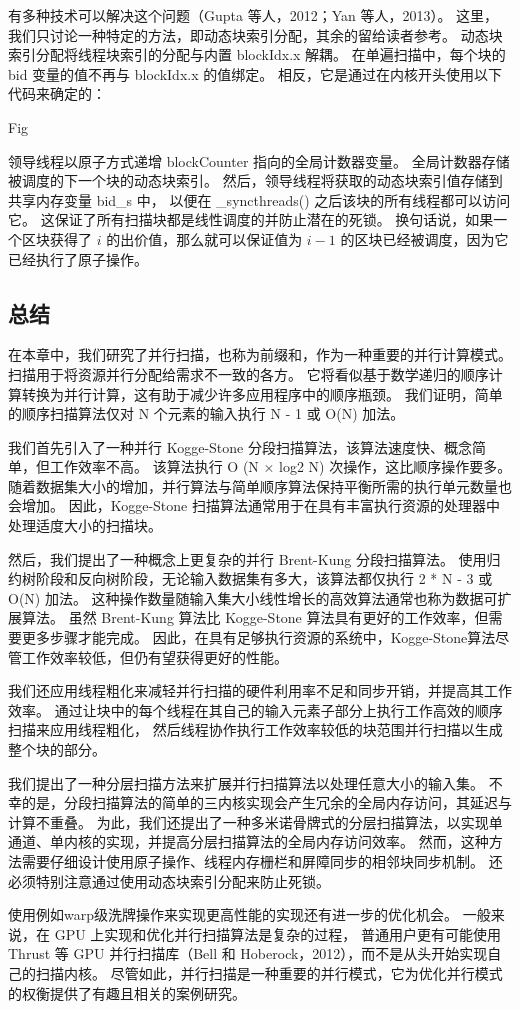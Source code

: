 有多种技术可以解决这个问题（Gupta 等人，2012；Yan 等人，2013）。 
这里，我们只讨论一种特定的方法，即动态块索引分配，其余的留给读者参考。 
动态块索引分配将线程块索引的分配与内置 blockIdx.x 解耦。 
在单遍扫描中，每个块的 bid 变量的值不再与 blockIdx.x 的值绑定。 相反，它是通过在内核开头使用以下代码来确定的：

{\color{red} Fig}

领导线程以原子方式递增 blockCounter 指向的全局计数器变量。 全局计数器存储被调度的下一个块的动态块索引。 
然后，领导线程将获取的动态块索引值存储到共享内存变量 bid\_s 中，
以便在 \_syncthreads() 之后该块的所有线程都可以访问它。 这保证了所有扫描块都是线性调度的并防止潜在的死锁。 
换句话说，如果一个区块获得了 $i$ 的出价值，那么就可以保证值为 $i-1$ 的区块已经被调度，因为它已经执行了原子操作。

\subsection{总结}
在本章中，我们研究了并行扫描，也称为前缀和，作为一种重要的并行计算模式。 扫描用于将资源并行分配给需求不一致的各方。 
它将看似基于数学递归的顺序计算转换为并行计算，这有助于减少许多应用程序中的顺序瓶颈。 
我们证明，简单的顺序扫描算法仅对 N 个元素的输入执行 N - 1 或 O(N) 加法。

我们首先引入了一种并行 Kogge-Stone 分段扫描算法，该算法速度快、概念简单，但工作效率不高。 
该算法执行 O (N × log2 N) 次操作，这比顺序操作要多。 
随着数据集大小的增加，并行算法与简单顺序算法保持平衡所需的执行单元数量也会增加。 
因此，Kogge-Stone 扫描算法通常用于在具有丰富执行资源的处理器中处理适度大小的扫描块。

然后，我们提出了一种概念上更复杂的并行 Brent-Kung 分段扫描算法。 
使用归约树阶段和反向树阶段，无论输入数据集有多大，该算法都仅执行 2 * N - 3 或 O(N) 加法。 
这种操作数量随输入集大小线性增长的高效算法通常也称为数据可扩展算法。 
虽然 Brent-Kung 算法比 Kogge-Stone 算法具有更好的工作效率，但需要更多步骤才能完成。 
因此，在具有足够执行资源的系统中，Kogge-Stone算法尽管工作效率较低，但仍有望获得更好的性能。

我们还应用线程粗化来减轻并行扫描的硬件利用率不足和同步开销，并提高其工作效率。 
通过让块中的每个线程在其自己的输入元素子部分上执行工作高效的顺序扫描来应用线程粗化，
然后线程协作执行工作效率较低的块范围并行扫描以生成整个块的部分。

我们提出了一种分层扫描方法来扩展并行扫描算法以处理任意大小的输入集。 
不幸的是，分段扫描算法的简单的三内核实现会产生冗余的全局内存访问，其延迟与计算不重叠。 
为此，我们还提出了一种多米诺骨牌式的分层扫描算法，以实现单通道、单内核的实现，并提高分层扫描算法的全局内存访问效率。 
然而，这种方法需要仔细设计使用原子操作、线程内存栅栏和屏障同步的相邻块同步机制。 
还必须特别注意通过使用动态块索引分配来防止死锁。

使用例如warp级洗牌操作来实现更高性能的实现还有进一步的优化机会。 
一般来说，在 GPU 上实现和优化并行扫描算法是复杂的过程，
普通用户更有可能使用 Thrust 等 GPU 并行扫描库（Bell 和 Hoberock，2012），而不是从头开始实现自己的扫描内核。 
尽管如此，并行扫描是一种重要的并行模式，它为优化并行模式的权衡提供了有趣且相关的案例研究。